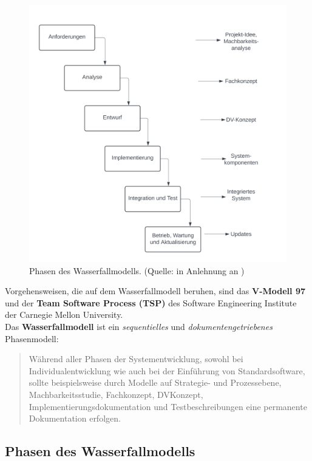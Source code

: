 \begin{figure}
    \centering
    \includegraphics[scale=0.3]{part one/Uebersicht ueber die Phasen des Entwicklungszyklus/img/wasserfallmodell}
    \caption{Phasen des Wasserfallmodells. (Quelle: in Anlehnung an \cite[318, Abbildung 14-3]{AABG14n})}
    \label{fig:wasserfallmodell}
\end{figure}


\noindent
Vorgehensweisen, die auf dem Wasserfallmodell beruhen, sind das \textbf{V-Modell 97} und der \textbf{Team Software Process (TSP)} des Software Engineering Institute der Carnegie Mellon University.\\

\noindent
Das \textbf{Wasserfallmodell} ist ein \textit{sequentielles} und \textit{dokumentengetriebenes} Phasenmodell:

\blockquote[{\cite[319]{AABG14n}}]{
    Während aller Phasen der Systementwicklung, sowohl bei Individualentwicklung
    wie auch bei der Einführung von Standardsoftware, sollte beispielsweise durch
    Modelle auf Strategie- und Prozessebene, Machbarkeitsstudie, Fachkonzept, DVKonzept, Implementierungsdokumentation
    und Testbeschreibungen eine permanente Dokumentation erfolgen.
}

\subsection{Phasen des Wasserfallmodells}


